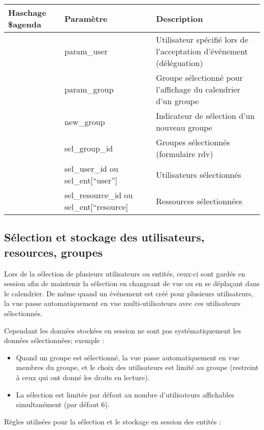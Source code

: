 \begin{tabular}{|l|p{3cm}|p{8cm}|}
 \hline
 \textbf{Haschage \$agenda} & \textbf{Paramètre} & \textbf{Description} \\
 \hline
  [``user\_id''] & param\_user & Utilisateur spécifié lors de l'acceptation d'événement (déléguation) \\ 
 \hline
  [``group\_view''] & param\_group & Groupe sélectionné pour l'affichage du calendrier d'un groupe \\ 
 \hline
  [``new\_group''] & new\_group & Indicateur de sélection d'un nouveau groupe\\
 \hline
  [``sel\_group\_id''] & sel\_group\_id & Groupes sélectionnés (formulaire rdv) \\ 
 \hline
  [``sel\_user\_id''] & sel\_user\_id ou sel\_ent[``user''] & Utilisateurs sélectionnés \\ 
 \hline
  [``sel\_resource\_id''] & sel\_resource\_id ou sel\_ent[``resource] & Ressources sélectionnées \\ 
 \hline
\end{tabular}


\subsection{Sélection et stockage des utilisateurs, resources, groupes}

Lors de la sélection de plusieurs utilisateurs ou entités, ceux-ci sont gardés en session afin de maintenir la sélection en changeant de vue ou en se déplaçant dans le calendrier.
De même quand un événement est créé pour plusieurs utilisateurs, la vue passe automatiquement en vue multi-utilisateurs avec ces utilisateurs sélectionnés.

Cependant les données stockées en session ne sont pas systématiquement les données sélectionnées; exemple :
\begin{itemize}
\item Quand un groupe est sélectionné, la vue passe automatiquement en vue membres du groupe, et le choix des utilisateurs est limité au groupe (restreint à ceux qui ont donné les droits en lecture).
\item La sélection est limitée par défaut au nombre d'utilisateurs affichables simultanément (par défaut 6).
\end{itemize}
\vspace{0.3cm}

Règles utilisées pour la sélection et le stockage en session des entités :\\

